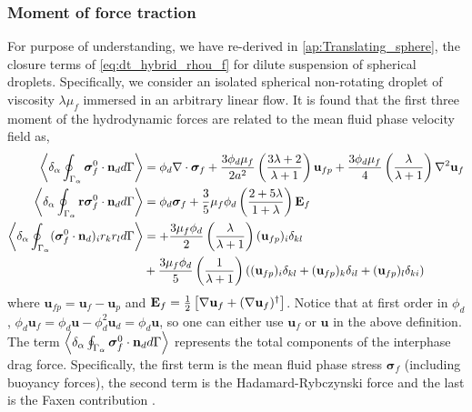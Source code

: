 \subsubsection{Moment of force traction}

For purpose of understanding, we have re-derived in \ref{ap:Translating_sphere}, the closure terms of \ref{eq:dt_hybrid_rhou_f} for dilute suspension of spherical droplets. 
Specifically, we consider an isolated spherical non-rotating droplet of viscosity $\lambda \mu_f$ immersed in an arbitrary linear flow. 
It is found that the first three moment of the hydrodynamic forces are related to the mean fluid phase velocity field as, 
\begin{align}
    \label{eq:zeroth_mom}
    \left<\delta_\alpha \oint_{\Gamma_\alpha} \bm{\sigma}_f^0\cdot \textbf{n}_d d\Gamma\right> &= 
    \phi_d \mathbf{\nabla}\cdot\bm\sigma_f
    + \frac{3\phi_d\mu_f}{2 a^2} 
    \left(\frac{3\lambda+2}{\lambda+1}\right) \textbf{u}_{f p} 
    + \frac{3\phi_d\mu_f}{4} \left(\frac{\lambda}{\lambda+1}\right)\mathbf{\nabla}^2\textbf{u}_f\\
    \label{eq:first_mom}
    \left<\delta_\alpha \oint_{\Gamma_\alpha} \textbf{r}\bm{\sigma}_f^0 \cdot \textbf{n}_d d\Gamma\right> 
    &= 
    \phi_d \bm\sigma_f + 
    \frac{3}{5}\mu_f \phi_d \left(\frac{2+5\lambda}{1+\lambda}\right)
    \textbf{E}_f
    \\
    \label{eq:second_mom}
        \left<\delta_\alpha \oint_{\Gamma_\alpha} (\bm{\sigma}_f^0 \cdot \textbf{n}_d)_ir_kr_l d\Gamma\right> &=
        + \frac{3\mu_f\phi_d}{2}\left(\frac{\lambda}{\lambda+1}\right)(\textbf{u}_{fp})_i\delta_{kl}\\
        &+ \frac{3\mu_f\phi_d}{5}\left(\frac{1}{\lambda+1}\right)((\textbf{u}_{fp})_i\delta_{kl}+ (\textbf{u}_{fp})_k\delta_{il}+(\textbf{u}_{fp})_l\delta_{ki})\nonumber
\end{align}
where $\textbf{u}_{fp} = \textbf{u}_f - \textbf{u}_p$ and $\textbf{E}_f = \frac{1}{2}\left[\mathbf{\nabla} \textbf{u}_f + (\mathbf{\nabla} \textbf{u}_f)^\dagger\right]$. 
Notice that at first order in $\phi_d$, $\phi_d\textbf{u}_f =\phi_d\textbf{u} - \phi_d^2 \textbf{u}_d = \phi_d\textbf{u}$, so one can either use $\textbf{u}_f$ or $\textbf{u}$ in the above definition. 
The term $\left<\delta_\alpha \oint_{\Gamma_\alpha} \bm{\sigma}_f^0 \cdot \textbf{n}_d d\Gamma\right>$ represents the total components of the interphase drag force.
Specifically, the first term is the mean fluid phase stress $\bm\sigma_f$ (including buoyancy forces), the second term is the Hadamard-Rybczynski force and the last is the Faxen contribution \citep{kim2013microhydrodynamics}. 
